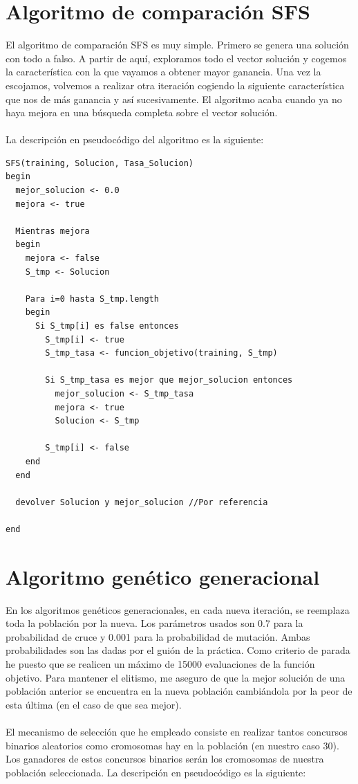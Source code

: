 	\section{Algoritmo de comparación SFS}
	El algoritmo de comparación SFS es muy simple. Primero se genera una solución con todo a
	falso. A partir de aquí, exploramos todo el vector solución y cogemos la característica con la que
	vayamos a obtener mayor ganancia. Una vez la escojamos, volvemos a realizar otra iteración cogiendo la siguiente característica que nos de más ganancia y así sucesivamente. El algoritmo acaba cuando ya no haya mejora en una búsqueda completa sobre el vector solución.
	\\
	\\
	La descripción en pseudocódigo del algoritmo es la siguiente:
	\begin{lstlisting}
SFS(training, Solucion, Tasa_Solucion)
begin
  mejor_solucion <- 0.0
  mejora <- true
  
  Mientras mejora
  begin
    mejora <- false
    S_tmp <- Solucion
    
    Para i=0 hasta S_tmp.length
    begin
      Si S_tmp[i] es false entonces
        S_tmp[i] <- true
        S_tmp_tasa <- funcion_objetivo(training, S_tmp)
        
        Si S_tmp_tasa es mejor que mejor_solucion entonces
          mejor_solucion <- S_tmp_tasa
          mejora <- true
          Solucion <- S_tmp
          
        S_tmp[i] <- false
    end
  end
  
  devolver Solucion y mejor_solucion //Por referencia
  
end
	\end{lstlisting}


	\section{Algoritmo genético generacional}
	En los algoritmos genéticos generacionales, en cada nueva iteración, se reemplaza toda la población por la nueva.
	Los parámetros usados son 0.7 para la probabilidad de cruce y 0.001 para la probabilidad de mutación. Ambas probabilidades son las dadas por el guión de la práctica. Como criterio de parada he puesto que se realicen un máximo de 15000 evaluaciones de la función objetivo. Para mantener el elitismo, me aseguro de que la mejor solución de una población anterior se encuentra en la nueva población cambiándola por la peor de esta última (en el caso de que sea mejor).
	\\
	\\
	El mecanismo de selección que he empleado consiste en realizar tantos concursos binarios aleatorios como cromosomas hay en la población (en nuestro caso 30). Los ganadores de estos concursos binarios serán los cromosomas de nuestra población seleccionada. La descripción en pseudocódigo es la siguiente:
	
